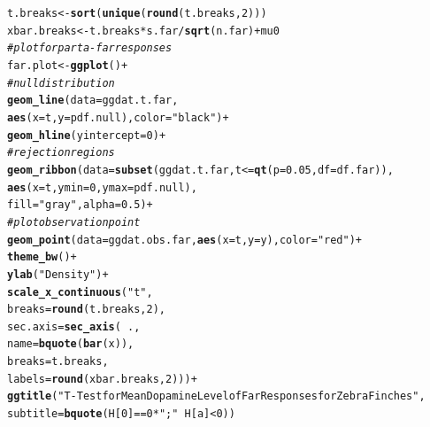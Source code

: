 \documentclass{article}\usepackage[]{graphicx}\usepackage[]{xcolor}
\makeatletter
\newcommand{\hlnum}[1]{\textcolor[rgb]{0.686,0.059,0.569}{#1}}%
\newcommand{\hlsng}[1]{\textcolor[rgb]{0.192,0.494,0.8}{#1}}%
\newcommand{\hlcom}[1]{\textcolor[rgb]{0.678,0.584,0.686}{\textit{#1}}}%
\newcommand{\hlopt}[1]{\textcolor[rgb]{0,0,0}{#1}}%
\newcommand{\hldef}[1]{\textcolor[rgb]{0.345,0.345,0.345}{#1}}%
\newcommand{\hlkwb}[1]{\textcolor[rgb]{0.69,0.353,0.396}{#1}}%
\newcommand{\hlkwc}[1]{\textcolor[rgb]{0.333,0.667,0.333}{#1}}%
\newcommand{\hlkwd}[1]{\textcolor[rgb]{0.737,0.353,0.396}{\textbf{#1}}}%
\newenvironment{kframe}{%
 \def\at@end@of@kframe{}%
 \ifinner\ifhmode%
  \def\at@end@of@kframe{\end{minipage}}%
  \begin{minipage}{\columnwidth}%
 \fi\fi%
 \def\FrameCommand##1{\hskip\@totalleftmargin \hskip-\fboxsep
 \colorbox{shadecolor}{##1}\hskip-\fboxsep
     \hskip-\linewidth \hskip-\@totalleftmargin \hskip\columnwidth}%
 \MakeFramed {\advance\hsize-\width
   \@totalleftmargin\z@ \linewidth\hsize
   \@setminipage}}%
 {\par\unskip\endMakeFramed%
 \at@end@of@kframe}
\newenvironment{knitrout}{}{} %
\makeatother
\begin{document}
\begin{enumerate}
\begin{enumerate}
\begin{knitrout}
\begin{kframe}
\begin{alltt}
\hldef{t.breaks} \hlkwb{<-} \hlkwd{sort}\hldef{(}\hlkwd{unique}\hldef{(}\hlkwd{round}\hldef{(t.breaks,} \hlnum{2}\hldef{)))}
\hldef{xbar.breaks} \hlkwb{<-} \hldef{t.breaks} \hlopt{*} \hldef{s.far}\hlopt{/}\hlkwd{sqrt}\hldef{(n.far)} \hlopt{+} \hldef{mu0}
\hlcom{#plot for part a - far responses}
\hldef{far.plot} \hlkwb{<-} \hlkwd{ggplot}\hldef{()} \hlopt{+}
\hlcom{# null distribution}
\hlkwd{geom_line}\hldef{(}\hlkwc{data}\hldef{=ggdat.t.far,}
          \hlkwd{aes}\hldef{(}\hlkwc{x}\hldef{=t,} \hlkwc{y}\hldef{=pdf.null),} \hlkwc{color} \hldef{=} \hlsng{"black"}\hldef{)}\hlopt{+}
\hlkwd{geom_hline}\hldef{(}\hlkwc{yintercept}\hldef{=}\hlnum{0}\hldef{)}\hlopt{+}
\hlcom{# rejection regions}
\hlkwd{geom_ribbon}\hldef{(}\hlkwc{data}\hldef{=}\hlkwd{subset}\hldef{(ggdat.t.far, t}\hlopt{<=}\hlkwd{qt}\hldef{(}\hlkwc{p} \hldef{=} \hlnum{0.05}\hldef{,} \hlkwc{df}\hldef{=df.far)),}
            \hlkwd{aes}\hldef{(}\hlkwc{x}\hldef{=t,} \hlkwc{ymin}\hldef{=}\hlnum{0}\hldef{,} \hlkwc{ymax}\hldef{=pdf.null),}
            \hlkwc{fill}\hldef{=}\hlsng{"gray"}\hldef{,} \hlkwc{alpha}\hldef{=}\hlnum{0.5}\hldef{)}\hlopt{+}
\hlcom{# plot observation point}
\hlkwd{geom_point}\hldef{(}\hlkwc{data}\hldef{=ggdat.obs.far,} \hlkwd{aes}\hldef{(}\hlkwc{x}\hldef{=t,} \hlkwc{y}\hldef{=y),} \hlkwc{color}\hldef{=}\hlsng{"red"}\hldef{)}\hlopt{+}
\hlkwd{theme_bw}\hldef{()}\hlopt{+}
\hlkwd{ylab}\hldef{(}\hlsng{"Density"}\hldef{)}\hlopt{+}
\hlkwd{scale_x_continuous}\hldef{(}\hlsng{"t"}\hldef{,}
                   \hlkwc{breaks} \hldef{=} \hlkwd{round}\hldef{(t.breaks,}\hlnum{2}\hldef{),}
                   \hlkwc{sec.axis} \hldef{=} \hlkwd{sec_axis}\hldef{(}\hlopt{~}\hldef{.,}
                                       \hlkwc{name} \hldef{=} \hlkwd{bquote}\hldef{(}\hlkwd{bar}\hldef{(x)),}
                                       \hlkwc{breaks} \hldef{= t.breaks,}
                                       \hlkwc{labels} \hldef{=} \hlkwd{round}\hldef{(xbar.breaks,}\hlnum{2}\hldef{)))}\hlopt{+}
\hlkwd{ggtitle}\hldef{(}\hlsng{"T-Test for Mean Dopamine Level of Far Responses for Zebra Finches "}\hldef{,}
        \hlkwc{subtitle}\hldef{=}\hlkwd{bquote}\hldef{(H[}\hlnum{0}\hldef{]}\hlopt{==}\hlnum{0}\hlopt{*}\hlsng{";"}\hlopt{~}\hldef{H[a]}\hlopt{<}\hlnum{0}\hldef{))}
\end{alltt}
\end{kframe}
\end{knitrout}
\begin{figure}[H]
\centering
\begin{knitrout}
\color{fgcolor}

\end{knitrout}
\end{figure}
\end{enumerate}
\end{enumerate}
\end{document}
